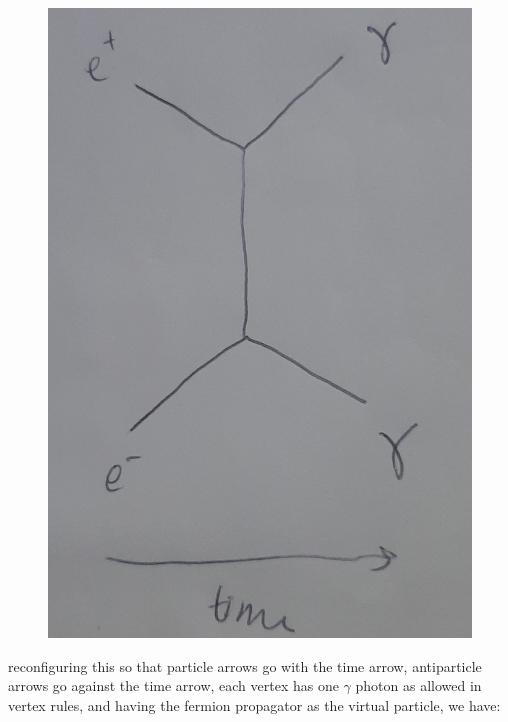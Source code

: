 \documentclass[11pt]{article}
\theoremstyle{definition}
\begin{document}
\begin{figure}[H]
    \centering
    \includegraphics[scale = 0.1]{t-channel with particles.jpg}
\end{figure}

reconfiguring this so that particle arrows go with the time arrow, antiparticle arrows go against the time arrow, each vertex has one $\gamma$ photon as allowed in vertex rules, and having the fermion propagator as the virtual particle, we have:
\end{document}
